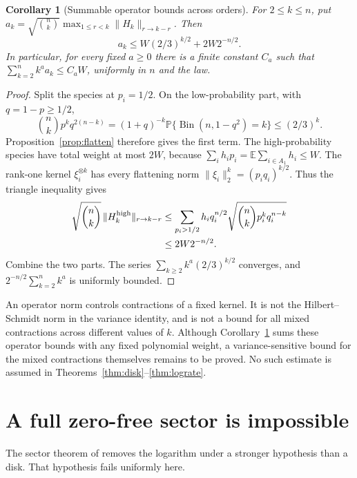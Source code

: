 \documentclass[11pt]{article}
\numberwithin{equation}{section}
\newtheorem{corollary}[theorem]{Corollary}
\theoremstyle{remark}\newtheorem{remark}[theorem]{Remark}
\newcommand{\E}{\mathbb E}\newcommand{\Pp}{\mathbb P}
\begin{document}
\begin{corollary}[Summable operator bounds across orders]\label{cor:summable}
For $2\le k\le n$, put
$a_k=\sqrt{\binom nk}\max_{1\le r<k}\|H_k\|_{r\to k-r}$.
Then
\[
 a_k\le W(2/3)^{k/2}+2W2^{-n/2}.
\]
In particular, for every fixed $a\ge0$ there is a finite constant $C_a$
such that $\sum_{k=2}^n k^a a_k\le C_aW$, uniformly in $n$ and the law.
\end{corollary}
\begin{proof}
Split the species at $p_i=1/2$. On the low-probability part,
with $q=1-p\ge1/2$,
\[
 \binom nk p^kq^{2(n-k)}
 =(1+q)^{-k}\Pp\{\operatorname{Bin}(n,1-q^2)=k\}
 \le(2/3)^k.
\]
Proposition~\ref{prop:flatten} therefore gives the first term. The
high-probability species have total weight at most $2W$, because
$\sum_i h_ip_i=\E\sum_{i\in A_1}h_i\le W$.
The rank-one kernel $\xi_i^{\otimes k}$ has every flattening norm
$\|\xi_i\|_2^k=(p_iq_i)^{k/2}$. Thus the triangle inequality gives
\begin{align*}
 \sqrt{\binom nk}\,\|H_k^{\rm high}\|_{r\to k-r}
 &\le\sum_{p_i>1/2}h_iq_i^{n/2}
       \sqrt{\binom nk p_i^kq_i^{n-k}}\\
 &\le2W2^{-n/2}.
\end{align*}
Combine the two parts. The series $\sum_{k\ge2}k^a(2/3)^{k/2}$
converges, and $2^{-n/2}\sum_{k=2}^n k^a$ is uniformly bounded.
\end{proof}

An operator norm controls contractions of a fixed kernel. It is not the
Hilbert--Schmidt norm in the variance identity, and is not a bound for
all mixed contractions across different values of $k$. Although
Corollary~\ref{cor:summable} sums these operator bounds with any fixed
polynomial weight, a variance-sensitive bound for the mixed contractions
themselves remains to be proved. No such estimate
is assumed in Theorems~\ref{thm:disk}--\ref{thm:lograte}.

\section{A full zero-free sector is impossible}\label{sec:sector}
The sector theorem of \cite[Theorem~1.4]{MS} removes the logarithm under
a stronger hypothesis than a disk. That hypothesis fails uniformly here.
\end{document}
